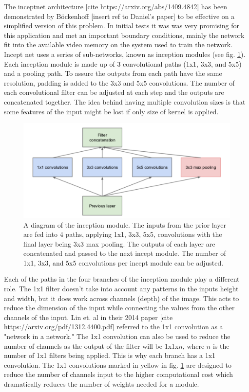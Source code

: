 \label{sec:code:inceptnet}

The inceptnet architecture [cite https://arxiv.org/abs/1409.4842] has been demonstrated by Böckenhoff [insert ref to Daniel's paper] to be effective on a simplified version of this problem.
In initial tests it was was very promising for this application and met an important boundary conditions, mainly the network fit into the available video memory on the system used to train the network.
Incept net uses a series of sub-networks, known as inception modules (see fig. \ref{fig:code:inceptmodule}).
Each inception module is made up of 3 convolutional paths (1x1, 3x3, and 5x5) and a pooling path.
To assure the outputs from each path have the same resolution, padding is added to the 3x3 and 5x5 convolutions.
The number of each convolutional filter can be adjusted at each step and the outputs are concatenated together.
The idea behind having multiple convolution sizes is that some features of the input might be lost if only size of kernel is applied.

\begin{figure}[htb]
    \includegraphics[width=\textwidth]{images/incept-simple.png}
    \caption{A diagram of the inception module. The inputs from the prior layer are fed into 4 paths, applying 1x1, 3x3, 5x5, convolutions with the final layer being 3x3 max pooling. The outputs of each layer are concatenated and passed to the next incept module. The number of 1x1, 3x3, and 5x5 convolutions per incept module can be adjusted.}
    \label{fig:code:inceptmodule}
\end{figure}

Each of the paths in the four branches of the inception module play a different role.
The 1x1 filter doesn't take into account any patterns in the inputs height and width, but it does work across channels (depth) of the image.
This acts to reduce the dimension of the input while connecting the values from the other channels of the input.
Lin et. al in their 2014 paper [cite https://arxiv.org/pdf/1312.4400.pdf] referred to the 1x1 convolution as a "network in a network."
The 1x1 convolution can also be used to reduce the number of channels as the output of the filter will be 1x1x$n$, where $n$ is the number of 1x1 filters being applied.
This is why each branch has a 1x1 convolution.
The 1x1 convolutions marked in yellow in fig. \ref{fig:code:inceptmodule} are designed to reduce the number of channels input to the higher computational cost which dramatically reduces the number of weights needed for a module.

